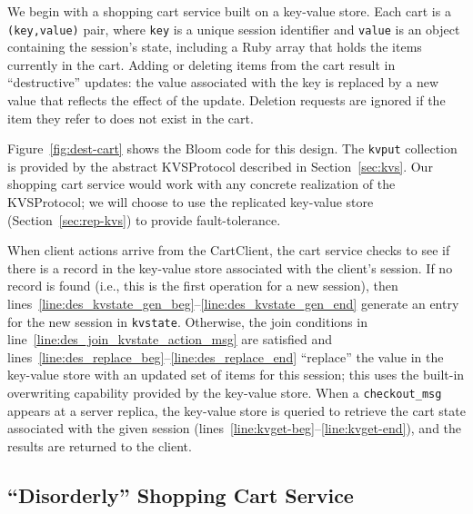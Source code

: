 We begin with a shopping cart service built on a key-value store.  Each cart is
a \texttt{(key,value)} pair, where \texttt{key} is a unique session identifier
and \texttt{value} is an object containing the session's state, including a Ruby
array that holds the items currently in the cart. Adding or deleting items from
the cart result in ``destructive'' updates: the value associated with the key is
replaced by a new value that reflects the effect of the update. Deletion
requests are ignored if the item they refer to does not exist in the cart.

Figure~\ref{fig:dest-cart} shows the Bloom code for this design. The
\texttt{kvput} collection is provided by the abstract KVSProtocol described in
Section~\ref{sec:kvs}. Our shopping cart service would work with any concrete
realization of the KVSProtocol; we will choose to use the replicated key-value
store (Section~\ref{sec:rep-kvs}) to provide fault-tolerance.

When client actions arrive from the CartClient, the cart service checks to see
if there is a record in the key-value store associated with the client's
session. If no record is found (i.e., this is the first operation for a new
session), then
lines~\ref{line:des_kvstate_gen_beg}--\ref{line:des_kvstate_gen_end} generate an
entry for the new session in \texttt{kvstate}.  Otherwise, the join conditions
in line~\ref{line:des_join_kvstate_action_msg} are satisfied and
lines~\ref{line:des_replace_beg}--\ref{line:des_replace_end} ``replace'' the
value in the key-value store with an updated set of items for this session; this
uses the built-in overwriting capability provided by the key-value store.  When
a \texttt{checkout\_msg} appears at a server replica, the key-value store is
queried to retrieve the cart state associated with the given session
(lines~\ref{line:kvget-beg}--\ref{line:kvget-end}), and the results are returned
to the client.

\subsection{``Disorderly'' Shopping Cart Service}

